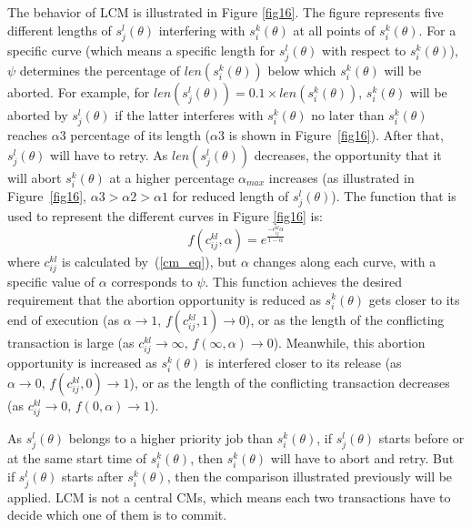 \documentclass[conference]{IEEEtran}
\begin{document}
The behavior of LCM  is illustrated in Figure \ref{fig16}. The figure represents five different lengths of $s_{j}^{l}(\theta)$
interfering with $s_{i}^{k}(\theta)$ at all points of $s_{i}^{k}(\theta)$.
For a specific curve (which means a specific length for $s_{j}^{l}(\theta)$ with respect to $s_i^k(\theta)$),
$\psi$ determines the percentage of $len(s_{i}^{k}(\theta))$
below which $s_{i}^{k}(\theta)$ will be aborted. For example, for
$len(s_{j}^{l}(\theta))=0.1\times len(s_{i}^{k}(\theta))$, $s_{i}^{k}(\theta)$
will be aborted by $s_{j}^{l}(\theta)$ if the latter interferes with
$s_{i}^{k}(\theta)$ no later than $s_{i}^{k}(\theta)$ reaches $\alpha3$
percentage of its length ($\alpha3$ is shown in Figure~\ref{fig16}). After that, $s_{j}^{l}(\theta)$ will have
to retry. As $len(s_{j}^{l}(\theta))$ decreases, the opportunity
that it will abort $s_{i}^{k}(\theta)$ at a higher percentage $\alpha_{max}$
increases (as illustrated in Figure~\ref{fig16}, $\alpha3>\alpha2>\alpha1$ for reduced length of $s_j^l(\theta)$). The function that is used to represent the 
different curves in Figure \ref{fig16} is:
 \begin{equation}
f(c_{ij}^{kl},\alpha)=e^{\frac{-c_{ij}^{kl}\alpha}{1-\alpha}}\label{eq49}\end{equation}
where $c_{ij}^{kl}$ is calculated by~(\ref{cm_eq}), but $\alpha$ changes
along each curve, with a specific value of $\alpha$ corresponds to $\psi$. This function achieves the desired requirement that the abortion opportunity is reduced as $s_{i}^{k}(\theta)$ gets
closer to its end of execution (as $\alpha\rightarrow1,\, f(c_{ij}^{kl},1)\rightarrow0$),
or as the length of the conflicting transaction is large (as $c_{ij}^{kl}\rightarrow\infty,\, f(\infty,\alpha)\rightarrow0$).
Meanwhile, this abortion opportunity is increased as $s_{i}^{k}(\theta)$
is interfered closer to its release (as $\alpha\rightarrow0,\, f(c_{ij}^{kl},0)\rightarrow1$),
or as the length of the conflicting transaction decreases (as $c_{ij}^{kl}\rightarrow0,\, f(0,\alpha)\rightarrow1$).

As $s_{j}^{l}(\theta)$ belongs to a higher priority job than $s_{i}^{k}(\theta)$, if $s_{j}^{l}(\theta)$ starts before or at the same start time of
$s_{i}^{k}(\theta)$, then $s_{i}^{k}(\theta)$ will have to abort
and retry. But if $s_{j}^{l}(\theta)$
starts after $s_{i}^{k}(\theta)$, then the comparison illustrated
previously will be applied. LCM is not a central CMs, which means each two transactions have to decide which one of them is to commit.
\end{document}

